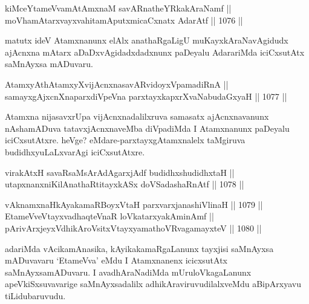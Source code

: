 
\begin{shl}
kiMceYtameVvamAtAmxnaM savARnatheYRkakAraNamf || \\
moVhamAtarxvayxvahitamAputxmicaCxnatx AdarAtf \hfill || 1076 ||  
\end{shl}

\begin{artha}
matutx ideV Atamxnanunx elAlx anathaRgaLigU muKayxkAraNavAgidudx ajAcnxna mAtarx aDaDxvAgidadxdadxnunx paDeyalu AdarariMda iciCxsutAtx saMnAyxsa mADuvaru.
\end{artha}


\begin{shl}
AtamxyAthAtamxyXvijAcnxnasavARvidoyxVpamadiRnA || \\
samayxgAjxcnXnaparxdiVpeVna parxtayxkapxrXvaNabudaGxyaH \hfill || 1077 ||  
\end{shl}

\begin{artha}
Atamxna nijasavxrUpa vijAcnxnadalilxruva samasatx ajAcnxnavanunx nAshamADuva tatavxjAcnxnaveMba diVpadiMda I Atamxnanunx paDeyalu iciCxsutAtxre. heVge? eMdare-parxtayxgAtamxnalelx taMgiruva budidhxyuLaLxvarAgi iciCxsutAtxre.
\end{artha}

\begin{shl}
virakAtxH savaRsaMsArAdAgarxjAdf budidhxshudidhxtaH || \\
utapxnanxniKilAnathaRtitayxkASx doVSadashaRnAtf \hfill || 1078 ||  
\end{shl}
				
\begin{shl}
vAknamxnaHkAyakamaRBoyxV\s taH parxvarxjanashiVlinaH \hfill || 1079 ||  \\
EtameVveVtayxvadhaqteVnaR loVkatarxyakAminAmf || \\
pArivArxjeyxV\s dhikAroV\s sitxVtayxyamathoVR\s vagamayxteV \hfill || 1080 ||  
\end{shl}

\begin{artha}
adariMda vAcikamAnasika, kAyikakamaRgaLanunx tayxjisi saMnAyxsa mADuvavaru `EtameVva' eMdu I Atamxnanenx icicxsutAtx saMnAyxsamADuvaru. I avadhAraNadiMda mUruloVkagaLanunx apeVkiSxsuvavarige saMnAyxsadalilx adhikAraviruvudilalxveMdu aBipArxyavu tiLidubaruvudu.
\end{artha}

